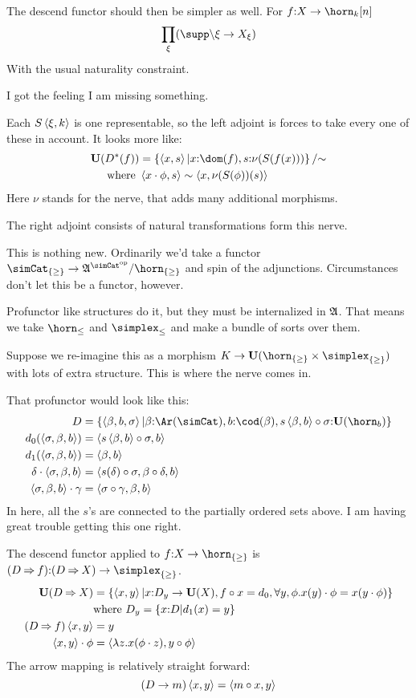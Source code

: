 \documentclass[csh.tex]{subfiles}
\begin{document}
The descend functor should then be simpler as well. For $f\of X\to\horn_k[n]$
\[ \prod_\xi(\supp \backslash \xi \to X_\xi) \]
With the usual naturality constraint.

I got the feeling I am missing something.

Each $S\left\langle \xi,k \right\rangle$ is one representable, so the left adjoint
is forces to take every one of these in account.
It looks more like: 
\begin{align*}
\base(D\ri(f)) &= \set{ \tuplet{x,s} | x\of\dom(f),s \of \nu(S(f(x)))}/{\mathord\sim}\\
\textrm{where } & \tuplet{x\cdot\phi,s} \sim \tuplet{x,\nu(S(\phi))(s)}
\end{align*}
Here $\nu$ stands for the nerve, that adds many additional morphisms.

The right adjoint consists of natural transformations form this nerve.

This is nothing new. Ordinarily we'd take a functor $\simCat_{\set\geq}\to\ambient\s/\horn_{\set\geq}$ and spin of the adjunctions. Circumstances don't let this be a functor, however.

Profunctor like structures do it, but they must be internalized in
$\mathfrak A$. That means we take $\horn_\leq$ and $\simplex_\leq$ and make
a bundle of sorts over them.

Suppose we re-imagine this as a morphism $K\to \base(\horn_{\set\geq}\times\simplex_{\set\geq})$ with lots of extra structure. This is where the nerve comes in.

That profunctor would look like this:
\begin{align*}
D &= \set{\tuplet{\beta,b,\sigma}|
\beta\of\Ar(\simCat),
b\of \cod(\beta),
s\tuplet{\beta,b}\circ \sigma\of \base(\horn_b)}\\
d_0(\tuplet{\sigma,\beta,b})&=\tuplet{s\tuplet{\beta,b}\circ\sigma,b}\\
d_1(\tuplet{\sigma,\beta,b})&=\tuplet{\beta,b}\\
\delta\cdot\tuplet{\sigma,\beta,b}&=
\tuplet{s(\delta)\circ\sigma,\beta\circ\delta,b}\\
\tuplet{\sigma,\beta,b}\cdot\gamma&=
\tuplet{\sigma\circ \gamma,\beta,b}
\end{align*}
In here, all the $s$'s are connected to the partially ordered sets above.
I am having great trouble getting this one right.

\newcommand\To{\mathbin\Rightarrow}
The descend functor applied to $f\of X\to \horn_{\set\geq}$ is 
$(D\To f)\of (D\To X) \to \simplex_{\set\geq}$.
\begin{align*}
\base(D\To X) &= \set{\tuplet{x,y}|
x\of D_y \to \base(X),
f\circ x = d_0,
\forall y,\phi.x(y)\cdot\phi = x(y\cdot \phi)}\\
& \textrm{where }D_y = \set{x\of D|d_1(x)=y}\\
(D\To f)\tuplet{x,y} &= y\\
\tuplet{x,y}\cdot\phi &= \tuplet{\lambda z.x(\phi\cdot z),y\circ\phi}
\end{align*}
The arrow mapping is relatively straight forward:
\[ (D\to m)\left\langle x,y \right\rangle = \left\langle m\circ x, y \right\rangle \]
\end{document}
